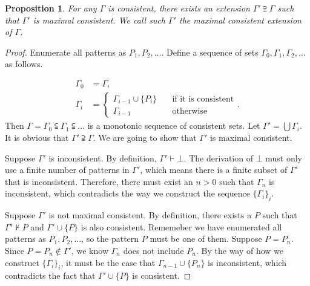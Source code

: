 \documentclass{article}
\theoremstyle{plain}
\newtheorem{prop}[thm]{Proposition}
\begin{document}
\begin{prop}
For any $\Gamma$ is consistent, there exists an extension $\Gamma' \supseteqq \Gamma$ such that $\Gamma'$ is maximal consistent. We call such $\Gamma'$ the maximal consistent extension of $\Gamma$.
\end{prop}
\begin{proof}
Enumerate all patterns as $P_1, P_2, \dots$. Define a sequence of sets $\Gamma_0, \Gamma_1, \Gamma_2, \dots$ as follows.

\begin{align*}
  \Gamma_0 &= \Gamma, \\
  \Gamma_{i} &= \begin{cases}
                  \Gamma_{i-1} \cup \{P_i\} \quad &\text{if it is consistent} \\
                  \Gamma_{i-1} \quad &\text{otherwise}
                \end{cases}.
\end{align*}
Then $\Gamma = \Gamma_0 \subseteqq \Gamma_1 \subseteqq \dots$ is a monotonic sequence of consistent sets. Let $\Gamma' = \bigcup \Gamma_i$. It is obvious that $\Gamma' \supseteqq \Gamma$. We are going to show that $\Gamma'$ is maximal consistent.

Suppose $\Gamma'$ is inconsistent. By definition, $\Gamma' \vdash \bot$. The derivation of $\bot$ must only use a finite number of patterns in $\Gamma'$, which means there is a finite subset of $\Gamma'$ that is inconsistent. Therefore, there must exist an $n > 0$ such that $\Gamma_n$ is inconsistent, which contradicts the way we construct the sequence $\{\Gamma_i\}_i$.

Suppose $\Gamma'$ is not maximal consistent. By definition, there exists a $P$ such that $\Gamma' \not \vdash P$ and $\Gamma' \cup \{P\}$ is also consistent. Rememeber we have enumerated all patterns as $P_1, P_2, \dots$, so the pattern $P$ must be one of them. Suppose $P = P_n$. Since $P = P_n \not \in \Gamma'$, we know $\Gamma_n$ does not include $P_n$. By the way of how we construct $\{\Gamma_i\}_i$, it must be the case that $\Gamma_{n-1} \cup \{P_n\}$ is inconsistent, which contradicts the fact that $\Gamma' \cup \{P\}$ is consistent.
\end{proof}
\end{document}
